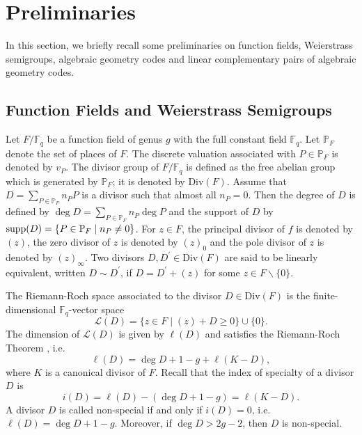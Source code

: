 \documentclass[journal,12pt,onecolumn]{IEEEtran}
\begin{document}



\section{Preliminaries}\label{pre}

In this section, we briefly recall some preliminaries on function fields, Weierstrass semigroups, algebraic geometry codes and linear complementary pairs of algebraic geometry codes. 

\subsection{Function Fields and Weierstrass Semigroups}
Let $F/\mathbb{F}_q$ be a function field of genus $g$ with the full constant field $\mathbb{F}_q$. Let $\mathbb{P}_F$ denote the set of places of $F$. The discrete valuation associated with $P\in\mathbb{P}_F$ is denoted by $v_P$. The divisor group of $F/\mathbb{F}_q$ is defined as the free abelian group which is generated by $\mathbb{P}_F$; it is denoted by $\text{Div}(F)$. Assume that $D=\sum_{P\in\mathbb{P}_F}n_PP$ is a divisor such that almost all $n_P=0$. Then the degree of $D$ is defined by $\deg D=\sum_{P\in\mathbb{P}_F}n_P\deg P$ and the support of $D$ by ${\rm supp}(D)=\{P\in \mathbb{P}_F\mid n_P\neq0\}$. For $z\in F$, the principal divisor of $f$ is denoted by $(z)$, the zero divisor of $z$ is denoted by $(z)_0$ and the pole divisor of $z$ is denoted by $(z)_\infty$. Two divisors $D,D^\prime\in\text{Div}(F)$ are said to be linearly equivalent, written $D\sim D^\prime$, if $D=D^\prime+(z)$ for some $z\in F\backslash\{0\}$. 

The Riemann-Roch space associated to the divisor $D\in\text{Div}(F)$ is the finite-dimensional $\mathbb{F}_q$-vector space
\[
    \mathcal{L}(D)=\{z\in F\mid (z)+D\ge 0 \}\cup\{0\}.
\]
The dimension of $\mathcal{L}(D)$ is given by $\ell(D)$ and satisfies the Riemann-Roch Theorem \cite[Thm. 1.5.15]{Algebraic_Function_Fields_and_Codes}, i.e. 
\[
    \ell(D)=\deg D+1-g+\ell(K-D),
\]
where $K$ is a canonical divisor of $F$. Recall that the index of specialty of a divisor $D$ is 
\[
    i(D)=\ell(D)-(\deg D+1-g)=\ell(K-D).
\]
A divisor $D$ is called non-special if and only if $i(D)=0$, i.e. $\ell(D)=\deg D+1-g$. Moreover, if $\deg D>2g-2$, then $D$ is non-special. 
\end{document}

